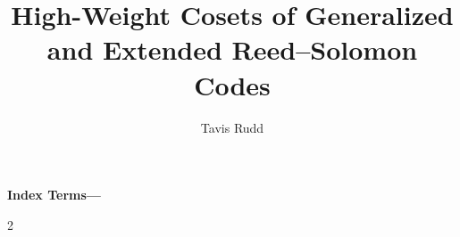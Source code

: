 \documentclass[11pt]{article}
\title{High-Weight Cosets of Generalized and Extended Reed--Solomon Codes}
\author{Tavis Rudd}
\date{}
\theoremstyle{upright}
\theoremstyle{definition}
\theoremstyle{remark}
\begin{document}
\raggedbottom
\maketitle

\begin{abstract}

\end{abstract}
\noindent\textbf{Index Terms---}













\appendix



\begingroup
\scriptsize
\raggedright
\begin{multicols}{2}


\end{multicols}
\endgroup
\end{document}
